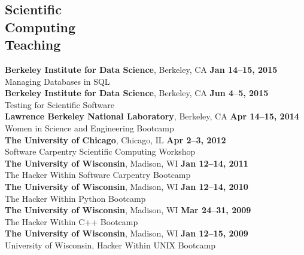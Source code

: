 \documentclass[margin,line]{resume}
\begin{document}
\begin{resume}
    \section{\mysidestyle Scientific\\Computing\\Teaching}
    \textbf{Berkeley Institute for Data Science}, Berkeley, CA \hfill \textbf{Jan 14--15, 2015}\\
    Managing Databases in SQL
               \vspace{2mm}\\
    \textbf{Berkeley Institute for Data Science}, Berkeley, CA \hfill \textbf{Jun 4--5, 2015}\\
    Testing for Scientific Software
               \vspace{2mm}\\
    \textbf{Lawrence Berkeley National Laboratory}, Berkeley, CA \hfill \textbf{Apr 14--15, 2014}\\
    Women in Science and Engineering Bootcamp
               \vspace{2mm}\\
    \textbf{The University of Chicago}, Chicago, IL \hfill \textbf{Apr 2--3, 2012}\\
    Software Carpentry Scientific Computing Workshop
               \vspace{2mm}\\
    \textbf{The University of Wisconsin}, Madison, WI \hfill\textbf{Jan 12--14, 2011}\\
    The Hacker Within Software Carpentry Bootcamp
               \vspace{2mm}\\
    \textbf{The University of Wisconsin}, Madison, WI \hfill \textbf{Jan 12--14, 2010}\\
    The Hacker Within Python Bootcamp
               \vspace{2mm}\\
    \textbf{The University of Wisconsin}, Madison, WI \hfill \textbf{Mar 24--31, 2009}\\
    The Hacker Within C++ Bootcamp
               \vspace{2mm}\\
    \textbf{The University of Wisconsin}, Madison, WI \hfill \textbf{Jan 12--15, 2009}\\
    University of Wisconsin, Hacker Within UNIX Bootcamp\\

\end{resume}
\end{document}
